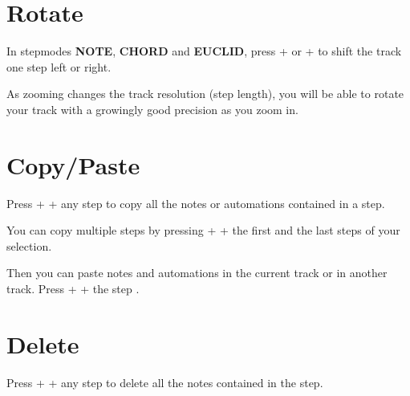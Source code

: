 



\section{Rotate}

In stepmodes \textbf{NOTE}, \textbf{CHORD} and \textbf{EUCLID}, press  + \btn{<} or  + \btn{>}  to shift the track one step left or right.

As zooming changes the track resolution (step length), you will be able to rotate your track with a growingly good precision as you zoom in.



\section{Copy/Paste}

Press  +  + any step \padsicon{} to copy all the notes or automations contained in a step.

You can copy multiple steps by pressing   +  + the first and the last steps \padsselectionicon{} of your selection.

Then you can paste notes and automations in the current track or in another track. Press   +  + the step \padsicon{}.



\section{Delete}

Press  +  + any step \padsicon{} to delete all the notes contained in the step.



